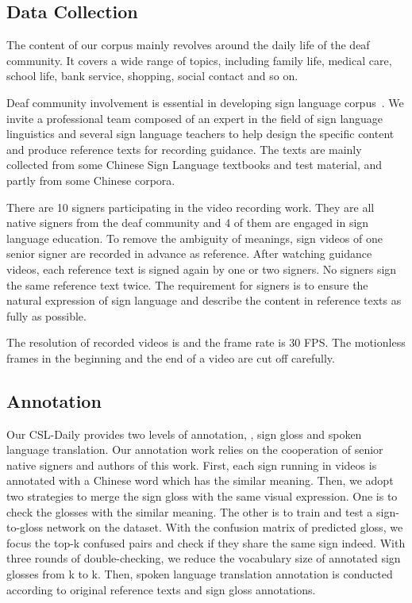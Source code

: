 \documentclass[final]{cvpr}
\begin{document}
\subsection{Data Collection}

The content of our corpus mainly revolves around the daily life of the deaf community. 
It covers a wide range of topics, including family life, medical care, school life, bank service, shopping, social contact and so on. 
 
Deaf community involvement is essential in developing sign language corpus~\cite{bragg2019slp}.
We invite a professional team composed of an expert in the field of sign language linguistics and several sign language teachers to help design the specific content and produce reference texts for recording guidance. 
The texts are mainly collected from some Chinese Sign Language textbooks and test material, and partly from some Chinese corpora. 

There are 10 signers participating in the video recording work. 
They are all native signers from the deaf community and 4 of them are engaged in sign language education. 
To remove the ambiguity of meanings, sign videos of one senior signer are recorded in advance as reference. 
After watching guidance videos, each reference text is signed again by one or two signers. 
No signers sign the same reference text twice. 
The requirement for signers is to ensure the natural expression of sign language and describe the content in reference texts as fully as possible. 

The resolution of recorded videos is  and the frame rate is 30 FPS. 
The motionless frames in the beginning and the end of a video are cut off carefully. 

\subsection{Annotation}

Our CSL-Daily provides two levels of annotation, \ie, sign gloss and spoken language translation.
Our annotation work relies on the cooperation of senior native signers and authors of this work. 
First, each sign running in videos is annotated with a Chinese word which has the similar meaning. 
Then, we adopt two strategies to merge the sign gloss with the same visual expression. 
One is to check the glosses with the similar meaning. 
The other is to train and test a sign-to-gloss network on the dataset. 
With the confusion matrix of predicted gloss, we focus the top-k confused pairs and check if they share the same sign indeed. 
With three rounds of double-checking, we reduce the vocabulary size of annotated sign glosses from k to k. 
Then, spoken language translation annotation is conducted according to original reference texts and sign gloss annotations.
\end{document}
